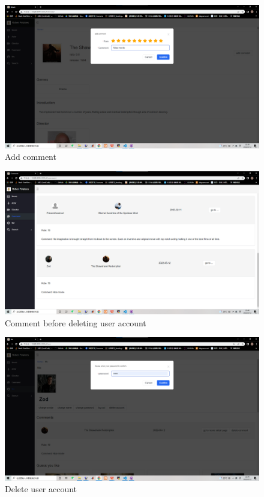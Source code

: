 \begin{CJK*}{UTF8}{gbsn}
    \begin{figure}[htbp]
    \centering
    \includegraphics[width=1\textwidth]{res_comment2.png}
    \caption{Add comment}
    \end{figure}
    
    \begin{figure}[htbp]
    \centering
    \includegraphics[width=1\textwidth]{res_comment3.png}
    \caption{Comment before deleting user account}
    \end{figure}
    
    \begin{figure}[htbp]
    \centering
    \includegraphics[width=1\textwidth]{res_delete1.png}
    \caption{Delete user account}
    \end{figure}
    

\end{CJK*}
